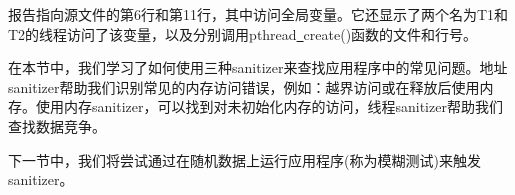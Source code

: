报告指向源文件的第6行和第11行，其中访问全局变量。它还显示了两个名为T1和T2的线程访问了该变量，以及分别调用pthread\underline{~}create()函数的文件和行号。\par

在本节中，我们学习了如何使用三种sanitizer来查找应用程序中的常见问题。地址sanitizer帮助我们识别常见的内存访问错误，例如：越界访问或在释放后使用内存。使用内存sanitizer，可以找到对未初始化内存的访问，线程sanitizer帮助我们查找数据竞争。\par

下一节中，我们将尝试通过在随机数据上运行应用程序(称为模糊测试)来触发sanitizer。\par




















